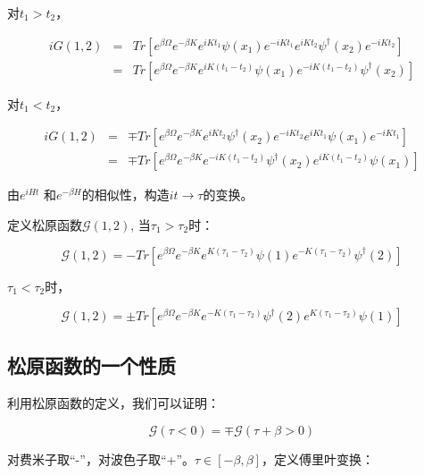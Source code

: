 对$t_1 > t_2$，

\begin{eqnarray*}
i G(1,2) & = & Tr \left[  e^{\beta \Omega} e^{ - \beta K }  e^{i K t_1} \psi(x_1) e^{-i K t_1} e^{ i K t_2} \psi^\dagger (x_2) e^{- i K t_2}   \right] \\
{} & = & Tr \left[  e^{\beta \Omega} e^{ - \beta K }  e^{i K ( t_1 - t_2 )} \psi(x_1) e^{-i K (t_1 -t_2)} \psi^\dagger (x_2)   \right]
\end{eqnarray*}

对$t_1 < t_2$，

\begin{eqnarray*}
i G(1,2) & = & \mp  Tr \left[  e^{\beta \Omega} e^{ - \beta K }  e^{i K t_2} \psi^\dagger(x_2) e^{-i K t_2} e^{ i K t_1} \psi (x_1) e^{- i K t_1}  \right] \\
{} & = & \mp Tr \left[  e^{\beta \Omega} e^{ - \beta K }  e^{- i K ( t_1 - t_2 )} \psi^\dagger(x_2) e^{ i K (t_1 -t_2)} \psi (x_1)   \right]
\end{eqnarray*}

由$e^{i H t}$ 和$e^{- \beta H}$的相似性，构造$ it \to \tau $的变换。

定义松原函数$\mathcal{ G } (1,2)$, 当$\tau_1 > \tau_2$时：

\begin{equation*}
\mathcal{ G } (1,2) = - Tr \left[ e^{\beta \Omega} e^{-\beta K}  e^{K(\tau_1 - \tau_2)} \psi(1) e^{- K(\tau_1 - \tau_2)} \psi^\dagger (2)   \right] 
\end{equation*}

$\tau_1 < \tau_2$时，


\begin{equation*}
\mathcal{ G } (1,2) = \pm Tr \left[ e^{\beta \Omega} e^{-\beta K}  e^{- K(\tau_1 - \tau_2)} \psi^\dagger (2) e^{ K(\tau_1 - \tau_2)} \psi(1)   \right] 
\end{equation*}

\subsection{松原函数的一个性质}

利用松原函数的定义，我们可以证明：

\begin{equation}
\mathcal{G} (\tau < 0) =  \mp \mathcal{ G } (\tau + \beta > 0)
\end{equation}

对费米子取“-”，对波色子取“+”。$\tau \in [-\beta , \beta ]$，定义傅里叶变换：

